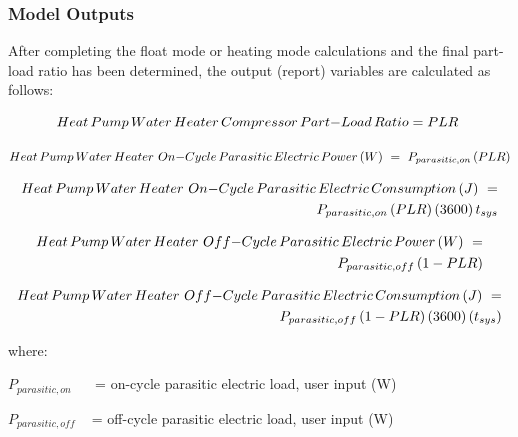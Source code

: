\subsubsection{Model Outputs}\label{model-outputs-000}

After completing the float mode or heating mode calculations and the final part-load ratio has been determined, the output (report) variables are calculated as follows:

\begin{equation}
Heat\,Pump\,Water\,Heater\,Compressor\,Part{\rm{ - }}Load\,Ratio = PLR\,\,
\end{equation}

\begin{equation}
Heat\,Pump\,Water\,Heater\,\,On{\rm{ - }}Cycle\,Parasitic\,Electric\,Power\,(W)\,\, = \,\,{P_{parasitic,on}}\left( {PLR} \right)
\end{equation}

\begin{equation}
\begin{split}
Heat\,Pump\,Water\,Heater\,\,On{\rm{ - }}Cycle\,Parasitic\,Electric\,Consumption\,(J)\,\, = \\{P_{parasitic,on}}\left( {PLR} \right)\left( {3600} \right){t_{sys}}
\end{split}
\end{equation}

\begin{equation}
\begin{split}
Heat\,Pump\,Water\,Heater\,\,Off{\rm{ - }}Cycle\,Parasitic\,Electric\,Power\,(W)\,\, = \\{P_{parasitic,off}}\left( {1 - PLR} \right)
\end{split}
\end{equation}

\begin{equation}
\begin{split}
Heat\,Pump\,Water\,Heater\,\,Off{\rm{ - }}Cycle\,Parasitic\,Electric\,Consumption\,(J)\,\, = \\{P_{parasitic,off}}\left( {1 - PLR} \right)\left( {3600} \right)\left( {{t_{sys}}} \right)
\end{split}
\end{equation}

where:

\({P_{parasitic,on}}\) ~~ = on-cycle parasitic electric load, user input (W)

\({P_{parasitic,off}}\) ~ = off-cycle parasitic electric load, user input (W)

